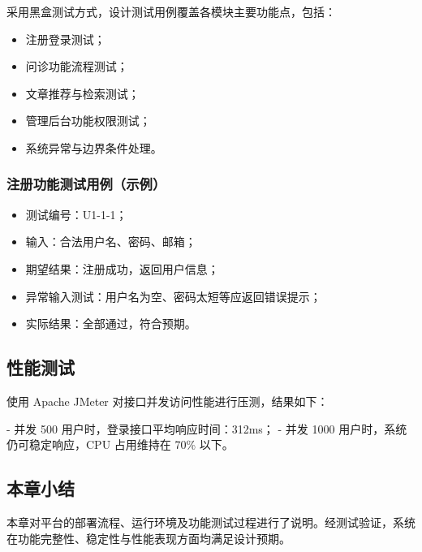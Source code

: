 采用黑盒测试方式，设计测试用例覆盖各模块主要功能点，包括：

\begin{itemize}
  \item 注册登录测试；
  \item 问诊功能流程测试；
  \item 文章推荐与检索测试；
  \item 管理后台功能权限测试；
  \item 系统异常与边界条件处理。
\end{itemize}

\subsubsection{注册功能测试用例（示例）}

\begin{itemize}
  \item 测试编号：U1-1-1；
  \item 输入：合法用户名、密码、邮箱；
  \item 期望结果：注册成功，返回用户信息；
  \item 异常输入测试：用户名为空、密码太短等应返回错误提示；
  \item 实际结果：全部通过，符合预期。
\end{itemize}

\subsection{性能测试}

使用 Apache JMeter 对接口并发访问性能进行压测，结果如下：

- 并发 500 用户时，登录接口平均响应时间：312ms；
- 并发 1000 用户时，系统仍可稳定响应，CPU 占用维持在 70\% 以下。

\subsection{本章小结}

本章对平台的部署流程、运行环境及功能测试过程进行了说明。经测试验证，系统在功能完整性、稳定性与性能表现方面均满足设计预期。

